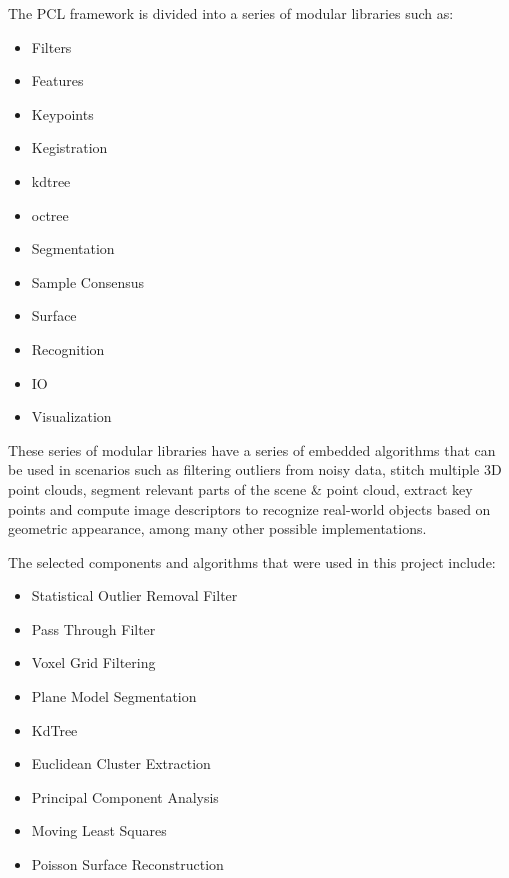 \documentclass[12pt]{report}
\begin{document}
    The PCL framework is divided into a series of modular libraries such as:
    \begin{multicols}{2}
    \begin{itemize}
      \itemsep0em 
      \item Filters
      \item Features
      \item Keypoints
      \item Kegistration
      \item kdtree
      \item octree
      \item Segmentation
      \item Sample Consensus
      \item Surface
      \item Recognition
      \item IO 
      \item Visualization
    \end{itemize}
    \end{multicols}
    
    These series of modular libraries  have a series of embedded algorithms  that can be used in scenarios such as filtering outliers from noisy data, stitch multiple 3D point clouds,
    segment relevant parts of the scene \& point cloud, extract key points and compute image descriptors to recognize real-world objects based on geometric appearance, among many other possible implementations.
    
    The selected components and algorithms that were used in this project include: 
    
    \begin{itemize}
      \itemsep0em 
      \item Statistical Outlier Removal Filter
      \item Pass Through Filter
      \item Voxel Grid Filtering
      \item Plane Model Segmentation
      \item KdTree
      \item Euclidean Cluster Extraction
      \item Principal Component Analysis
      \item Moving Least Squares
      \item Poisson Surface Reconstruction 
    \end{itemize}
    
\end{document}
